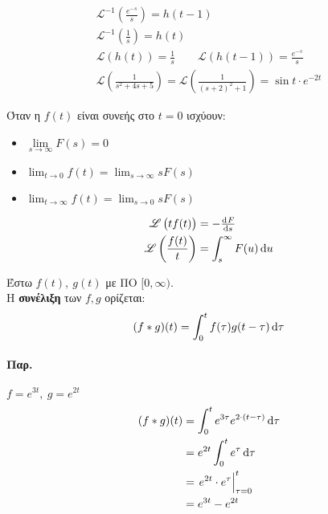\documentclass[11pt,a4paper,titlepage,final]{article}
\begin{document}
\begin{gather*}
\mathscr{L}^{-1} \left(
\frac{e^{-s}}{s}\right)=h(t-1)\\
\mathscr{L}^{-1}\left(\frac{1}{s}\right) = h(t)\\
\mathscr{L}\left(
h(t)
\right) = \frac{1}{s}\qquad
\mathscr{L}\left(
h(t-1)
\right)=\frac{e^{-s}}{s}\\
\mathscr{L}\left(
\frac{1}{s^2+4s+5}
\right) = \mathscr{L}\left(
\frac{1}{(s+2)^2+1}
\right)=\sin t \cdot e^{-2t}
\end{gather*}

\begin{theorem*}{}
Όταν η \(f(t)\) είναι συνεής στο \(t=0\) ισχύουν:
\begin{itemize}
\item \(\lim\limits_{s\to \infty} F(s)=0 \)
\item \(\lim_{t\to0} f(t) = \lim_{s\to \infty} sF(s)  \)
\item \(\lim_{t\to \infty}f(t) = \lim_{s\to 0} s F(s)  \)
\end{itemize}
\end{theorem*}

\begin{theorem*}{}
\begin{align*}
\mathscr L\left( t f(t)\right) &= - \od{F}{s} \\
\mathscr L \left( \frac{f(t)}{t}\right) &= \int_s^\infty F(u) \dif u
\end{align*}

\end{theorem*}

\begin{defn*}{}
Έστω \(f(t),\ g(t)\) με ΠΟ \( [0,\infty) \). \\
Η \textbf{συνέλιξη} των \(f,g\) ορίζεται:
\[
(f*g)(t) = \int_0^t f(\tau)g(t-\tau)\dif\tau
\]
\end{defn*}

\paragraph{Παρ.}
\(f=e^{3t},\ g=e^{2t}\)
\begin{align*}
(f*g)(t) &= \int_0^t e^{3\tau} e^{2\cdot(t-\tau)}\dif \tau
\\ &=
e^{2t} \int_0^t e^\tau \dif\tau \\
&= \left. e^{2t} \cdot e^\tau  \right|_{\tau=0}^t
\\ &= e^{3t}-e^{2t}
\end{align*}
\end{document}
